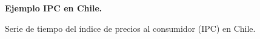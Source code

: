 \begin{figure}[h]
	\centering
	\textbf{Ejemplo IPC en Chile.}\par\medskip
	\caption{Serie de tiempo del índice de precios al consumidor (IPC) en Chile.}\label{fig18}
\end{figure}


\pagebreak

